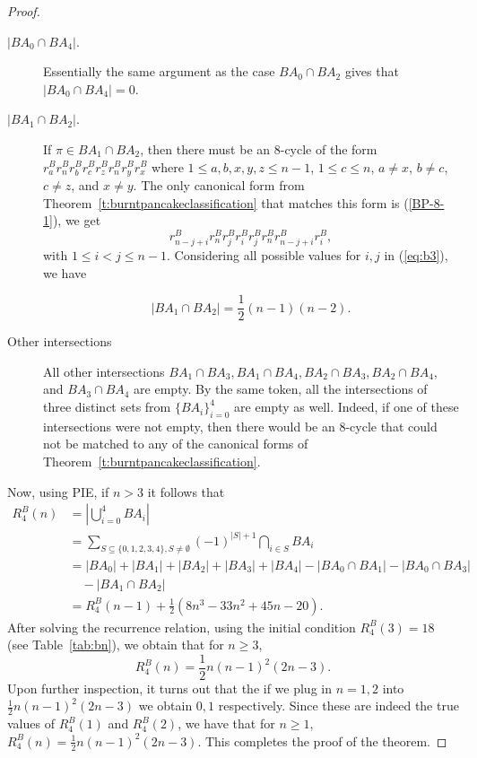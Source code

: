 \documentclass[final]{dmtcs-episciences}
\numberwithin{equation}{section}
\begin{document}
\begin{proof}
\begin{description}
\item[$|BA_0 \cap BA_4|$.] Essentially the same argument as the case $BA_0 \cap BA_2$ gives that $|BA_0 \cap BA_4|=0$.

\item[$|BA_1 \cap BA_2|$.] If $\pi \in BA_1 \cap BA_2$, then there must be an 8-cycle of the form $r^B_a r^B_n r^B_b r^B_c r^B_z r^B_n r^B_y r^B_x$ where $1 \leq a,b,x,y,z \leq n-1$, $1 \leq c \leq n$, $a \neq x$, $b \neq c$, $c \neq z$, and $x \neq y$. The only canonical form from Theorem~\ref{t:burntpancakeclassification} that matches this form is (\ref{BP-8-1}), we get 
\begin{equation}\label{eq:b3}
r^B_{n-j+i}r^B_{n}r^B_{j}r^B_{i}r^B_{j}r^B_{n}r^B_{n-j+i}r^B_{i},
\end{equation}  with $1\leq i<j \leq n-1$. Considering all possible values for $i,j$ in (\ref{eq:b3}), we have 

\begin{displaymath}|BA_1 \cap BA_2| = \frac{1}{2}(n-1)(n-2).\end{displaymath}

\item[Other intersections] All other intersections $BA_1 \cap BA_3, BA_1 \cap BA_4,BA_2 \cap BA_3, BA_2 \cap BA_4$, and $BA_3 \cap BA_4$ are empty. By the same token, all the intersections of three distinct sets from $\{BA_i\}_{i=0}^4$ are empty as well. Indeed, if one of these intersections were not empty, then there would be an 8-cycle that could not be matched to any of the canonical forms of Theorem~\ref{t:burntpancakeclassification}.
\end{description} Now, using PIE, if $n>3$ it follows that
\begin{align*}
    R^B_4(n) &= \left|\bigcup_{i=0}^4BA_i\right| \\
          &= \sum_{S \subseteq \{0,1,2,3,4\}, S \neq \emptyset} (-1)^{|S|+1} \bigcap_{i \in S} BA_i\\ 
          &= |BA_0| + |BA_1| + |BA_2| + |BA_3| + |BA_4| - |BA_0 \cap BA_1| -|BA_0 \cap BA_3|\\ &\quad - |BA_1 \cap BA_2|\\
          &=R^B_4(n-1) +  \frac{1}{2}(8n^3-33n^2+45n-20).
\end{align*} After solving the recurrence relation, using the initial condition $R^B_4(3)=18$ (see Table~\ref{tab:bn}), we obtain that for $n\geq3$,
\[
R^B_4(n)=\frac{1}{2} n(n-1)^2(2n-3).
\] Upon further inspection, it turns out that the if we plug in $n=1,2$ into $\frac{1}{2} n(n-1)^2(2n-3)$ we obtain $0,1$ respectively. Since these are indeed the true values of $R^B_4(1)$ and $R^B_4(2)$, we have that for $n\geq1$, $R^B_4(n)=\frac{1}{2} n(n-1)^2(2n-3)$. This completes the proof of the theorem. 
\end{proof}
\end{document}
